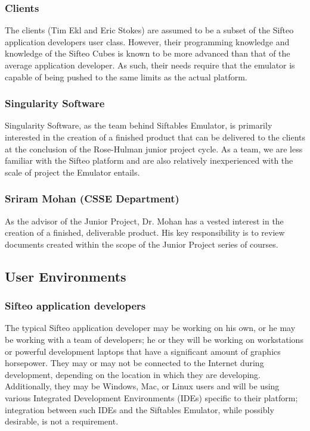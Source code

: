 \documentclass[12pt]{article}
\begin{document}
                          \subsubsection{Clients}
                          The clients (Tim Ekl and Eric Stokes) are assumed to be a subset of the Sifteo application developers user class. However, their programming knowledge and knowledge of the Sifteo Cubes is known to be more advanced than that of the average application developer. As such, their needs require that the emulator is capable of being pushed to the same limits as the actual platform.

                          \subsubsection{Singularity Software}
                          Singularity Software, as the team behind Siftables Emulator, is primarily interested in the creation of a finished product that can be delivered to the clients at the conclusion of the Rose-Hulman junior project cycle. As a team, we are less familiar with the Sifteo platform and are also relatively inexperienced with the scale of project the Emulator entails.

                          \subsubsection{Sriram Mohan (CSSE Department)}
                          As the advisor of the Junior Project, Dr. Mohan has a vested interest in the creation of a finished, deliverable product. His key responsibility is to review documents created within the scope of the Junior Project series of courses.

               \subsection{User Environments}

                          \subsubsection{Sifteo application developers}
                          The typical Sifteo application developer may be working on his own, or he may be working with a team of developers; he or they will be working on workstations or powerful development laptops that have a significant amount of graphics horsepower. They may or may not be connected to the Internet during development, depending on the location in which they are developing. Additionally, they may be \gls{Windows}, \gls{Mac}, or \gls{Linux} users and will be using various Integrated Development Environments (IDEs) specific to their platform; integration between such IDEs and the Siftables Emulator, while possibly desirable, is not a requirement.
\end{document}
